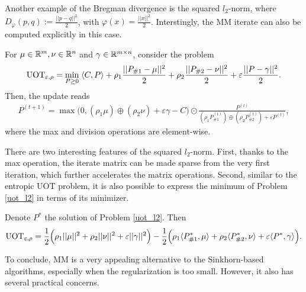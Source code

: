Another example of the Bregman divergence is the squared $l_2$-norm, where
$D_{\varphi}(p, q) := \frac{|| p - q||^2}{2}$, with $\varphi(x) = \frac{||x||^2}{2}$. Interstingly,
the MM iterate can also be computed explicitly in this case.
\begin{corollary}
  \label{coro:uot_l2_mm}
  For $\mu \in \mathbb R^m, \nu \in \mathbb R^n$ and $\gamma \in \mathbb R^{m \times n}$,  consider the
  problem
  \begin{align}
  \label{uot_l2}
      \text{UOT}_{\varepsilon, \rho} =
      \min_{P \geq 0} \; \langle C, P \rangle + \rho_1 \frac{||P_{\# 1} - \mu||^2}{2}
      + \rho_2 \frac{|| P_{\# 2} - \nu ||^2}{2} + \varepsilon  \frac{||P - \gamma||^2}{2}.
  \end{align}
  Then, the update reads
  \begin{align}
      P^{(t+1)} = \max \Big(0, (\rho_1 \mu) \oplus (\rho_2 \nu) + \varepsilon \gamma - C \Big)
      \odot \frac{P^{(t)}}{(\rho_1 P^{(t)}_{\# 1}) \oplus (\rho_2 P^{(t)}_{\# 2})
      + \varepsilon P^{(t)}},
  \end{align}
  where the max and division operations are element-wise.
\end{corollary}
There are two interesting features of the squared $l_2$-norm. First, thanks to the max operation,
the iterate matrix can be made sparse from the very first iteration,
which further accelerates the matrix operations. Second, similar to the entropic UOT problem,
it is also possible to express the minimum of Problem \eqref{uot_l2} in terms of its minimizer.
\begin{corollary}
  \label{coro:uot_l2_minimizer}
Denote $P^*$ the solution of Problem \eqref{uot_l2}. Then
\begin{align}
  \text{UOT}_{\varepsilon, \rho} = \frac{1}{2} \Big( \rho_1 ||\mu||^2
  + \rho_2 ||\nu||^2 + \varepsilon ||\gamma||^2 \Big)
  - \frac{1}{2} \Big( \rho_1 \langle P^*_{\# 1}, \mu \rangle
  + \rho_2 \langle P^*_{\# 2}, \nu \rangle + \varepsilon \langle P^*, \gamma \rangle \Big).
\end{align}
\end{corollary}
To conclude, MM is a very appealing alternative to the Sinkhorn-based algorithms,
especially when the regularization is too small. However, it also has several practical concerns.
